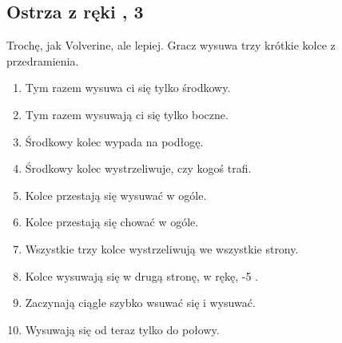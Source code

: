\subsection{Ostrza z ręki \abh{}, 3 \abnkp{}}
Trochę, jak Volverine, ale lepiej.
Gracz wysuwa trzy krótkie kolce z przedramienia.
\begin{enumerate}
	\item Tym razem wysuwa ci się tylko środkowy.
	\item Tym razem wysuwają ci się tylko boczne.
	\item Środkowy kolec wypada na podłogę.
	\item Środkowy kolec wystrzeliwuje, \dii{} czy kogoś trafi.
	\item Kolce przestają się wysuwać w ogóle.
	\item Kolce przestają się chować w ogóle.
	\item Wszystkie trzy kolce wystrzeliwują we wszystkie strony.
	\item Kolce wysuwają się w drugą stronę, w rękę, -5 \abzyc{}.
	\item Zaczynają ciągle szybko wsuwać się i wysuwać.
	\item Wysuwają się od teraz tylko do połowy.
\end{enumerate}







